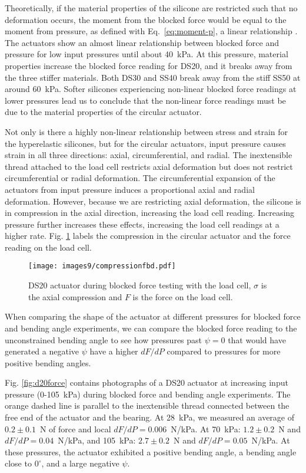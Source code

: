 Theoretically, if the material properties of the silicone are restricted such that no deformation occurs, the moment from the blocked force would be equal to the moment from pressure, as defined with Eq.~\ref{eq:moment-p}, a linear relationship \cite{polygerinos_modeling_2015}. The actuators show an almost linear relationship between blocked force and pressure for low input pressures until about 40~kPa. At this pressure, material properties increase the blocked force reading for DS20, and it breaks away from the three stiffer materials. Both DS30 and SS40 break away from the stiff SS50 at around 60~kPa. Softer silicones experiencing non-linear blocked force readings at lower pressures lead us to conclude that the non-linear force readings must be due to the material properties of the circular actuator.

Not only is there a highly non-linear relationship between stress and strain for the hyperelastic silicones, but for the circular actuators, input pressure causes strain in all three directions: axial, circumferential, and radial. The inextensible thread attached to the load cell restricts axial deformation but does not restrict circumferential or radial deformation. The circumferential expansion of the actuators from input pressure induces a proportional axial and radial deformation. However, because we are restricting axial deformation, the silicone is in compression in the axial direction, increasing the load cell reading. Increasing pressure further increases these effects, increasing the load cell readings at a higher rate. Fig. \ref{fig:compressionfbd} labels the compression in the circular actuator and the force reading on the load cell. 

\begin{figure}[!ht]
    \centering
     \texttt{[image: images9/compressionfbd.pdf]}
    \caption{DS20 actuator during blocked force testing with the load cell, $\sigma$ is the axial compression and $F$ is the force on the load cell.}
    \label{fig:compressionfbd}
\end{figure}

When comparing the shape of the actuator at different pressures for blocked force and bending angle experiments, we can compare the blocked force reading to the unconstrained bending angle to see how pressures past $\psi=0$ that would have generated a negative $\psi$ have a higher $dF/dP$ compared to pressures for more positive bending angles.  

Fig. \ref{fig:d20force} contains photographs of a DS20 actuator at increasing input pressure (0-105~kPa) during blocked force and bending angle experiments. The orange dashed line is parallel to the inextensible thread connected between the free end of the actuator and the bearing. At 28~kPa, we measured an average of $0.2\pm0.1$~N of force and local $dF/dP=0.006$~N/kPa. At 70~kPa: $1.2\pm0.2$~N and $dF/dP=0.04$~N/kPa, and 105~kPa: $2.7\pm0.2$~N and $dF/dP=0.05$~N/kPa. At these pressures, the actuator exhibited a positive bending angle, a bending angle close to $0^\circ$, and a large negative $\psi$. 

